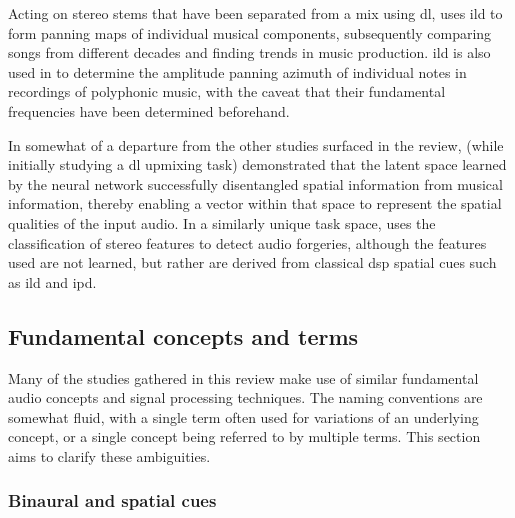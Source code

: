 \documentclass[referee,pdflatex,sn-mathphys-num]{sn-jnl}%
\begin{document}
Acting on stereo stems that have been separated from a mix using \gls{dl}, \cite{rodriguezSpectralDynamicConstellations2024} uses \gls{ild} to form panning maps of individual musical components, subsequently comparing songs from different decades and finding trends in music production. \gls{ild} is also used in \cite{heittolaAzimuthEstimationPolyphonic2009} to determine the amplitude panning azimuth of individual notes in recordings of polyphonic music, with the caveat that their fundamental frequencies have been determined beforehand.

In somewhat of a departure from the other studies surfaced in the review, \cite{yangUpmixingStyleTransfer2022} (while initially studying a \gls{dl} upmixing task) demonstrated that the latent space learned by the neural network successfully disentangled spatial information from musical information, thereby enabling a vector within that space to represent the spatial qualities of the input audio. In a similarly unique task space, \cite{renaldiUtilizingStereoPanning2025} uses the classification of stereo features to detect audio forgeries, although the features used are not learned, but rather are derived from classical \gls{dsp} spatial cues such as \gls{ild} and \gls{ipd}.

\subsection{Fundamental concepts and terms}
\label{sec:fundamental_techniques}

Many of the studies gathered in this review make use of similar fundamental audio concepts and signal processing techniques. The naming conventions are somewhat fluid, with a single term often used for variations of an underlying concept, or a single concept being referred to by multiple terms. This section aims to clarify these ambiguities.

\subsubsection{Binaural and spatial cues}
\label{sec:binaural_and_spatial_cues}
\end{document}
